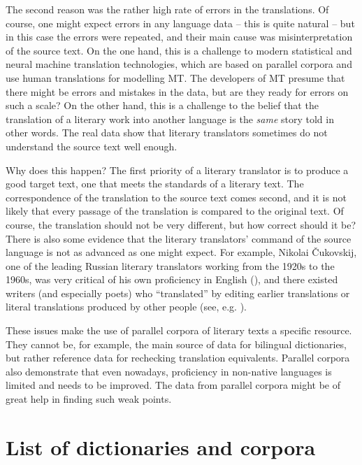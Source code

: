 \documentclass[output=paper]{langscibook}
\begin{document}
The second reason was the rather high rate of errors in the translations. Of course, one might expect errors in any language data – this is quite natural – but in this case the errors were repeated, and their main cause was misinterpretation of the source text. On the one hand, this is a challenge to modern statistical and neural machine translation technologies, which are based on parallel corpora and use human translations for modelling MT. The developers of MT presume that there might be errors and mistakes in the data, but are they ready for errors on such a scale? On the other hand, this is a challenge to the belief that the translation of a literary work into another language is the \textit{same} story told in other words. The real data show that literary translators sometimes do not understand the source text well enough.

Why does this happen? The first priority of a literary translator is to produce a good target text, one that meets the standards of a literary text. The correspondence of the translation to the source text comes second, and it is not likely that every passage of the translation is compared to the original text. Of course, the translation should not be very different, but how correct should it be? There is also some evidence that the literary translators’ command of the source language is not as advanced as one might expect. For example, Nikolai Čukovskij, one of the leading Russian literary translators working from the 1920s to the 1960s, was very critical of his own proficiency in English (\citealt{ČukovskiČukovski2004}), and there existed writers (and especially poets) who “translated” by editing earlier translations or literal translations produced by other people (see, e.g. \citealt{Kamovnikova2019}).

These issues make the use of parallel corpora of literary texts a specific resource. They cannot be, for example, the main source of data for bilingual dictionaries, but rather reference data for rechecking translation equivalents. Parallel corpora also demonstrate that even nowadays, proficiency in non-native languages is limited and needs to be improved. The data from parallel corpora might be of great help in finding such weak points.

\section*{List of dictionaries and corpora}
\end{document}
